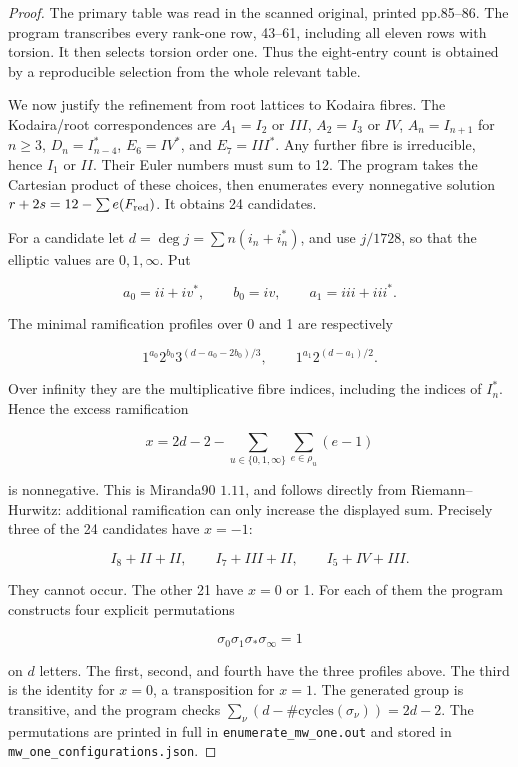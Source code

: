 \begin{proof}
The primary table was read in the scanned original, printed pp.85--86. The program  transcribes every rank-one row, 43--61, including all eleven rows with torsion. It then selects torsion order one. Thus the eight-entry count is obtained by a reproducible selection from the whole relevant table.

We now justify the refinement from root lattices to Kodaira fibres. The Kodaira/root correspondences are \(A_1=I_2\) or \(III\), \(A_2=I_3\) or \(IV\), \(A_n=I_{n+1}\) for \(n\geq3\), \(D_n=I^*_{n-4}\), \(E_6=IV^*\), and \(E_7=III^*\). Any further fibre is irreducible, hence \(I_1\) or \(II\). Their Euler numbers must sum to 12. The program takes the Cartesian product of these choices, then enumerates every nonnegative solution \(r+2s=12-\sum e(F_{\rm red})\). It obtains 24 candidates.

For a candidate let \(d=\deg j=\sum n(i_n+i_n^*)\), and use \(j/1728\), so that the elliptic values are \(0,1,\infty\). Put

\[
 a_0=ii+iv^*,\qquad b_0=iv,
 \qquad a_1=iii+iii^*.
\]

The minimal ramification profiles over 0 and 1 are respectively

\[
 1^{a_0}2^{b_0}3^{(d-a_0-2b_0)/3},\qquad
 1^{a_1}2^{(d-a_1)/2}.
\]

Over infinity they are the multiplicative fibre indices, including the indices of \(I_n^*\). Hence the excess ramification

\[
 x=2d-2-\sum_{u\in\{0,1,\infty\}}\sum_{e\in\rho_u}(e-1)
\]

is nonnegative. This is Miranda90 \(1.11\), and follows directly from Riemann--Hurwitz: additional ramification can only increase the displayed sum. Precisely three of the 24 candidates have \(x=-1\):

\[
 I_8+II+II,\qquad I_7+III+II,\qquad I_5+IV+III.
\]

They cannot occur. The other 21 have \(x=0\) or 1. For each of them the program constructs four explicit permutations

\[
 \sigma_0\sigma_1\sigma_*\sigma_\infty=1
\]

on \(d\) letters. The first, second, and fourth have the three profiles above. The third is the identity for \(x=0\), a transposition for \(x=1\). The generated group is transitive, and the program checks \(\sum_\nu(d-\#\mathrm{cycles}(\sigma_\nu))=2d-2\). The permutations are printed in full in \texttt{enumerate\_mw\_one.out} and stored in \texttt{mw\_one\_configurations.json}.


\end{proof}
